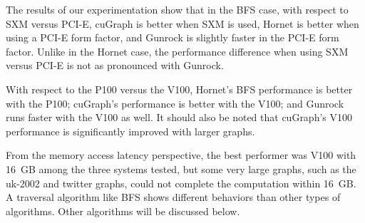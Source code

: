The results of our experimentation show that in the BFS case, with respect to SXM versus PCI-E, cuGraph is better when SXM is used, Hornet is better when using a PCI-E form factor, and Gunrock is slightly faster in the PCI-E form factor. Unlike in the Hornet case, the performance difference when using SXM versus PCI-E is not as pronounced with Gunrock.

With respect to the P100 versus the V100, Hornet's BFS performance is better with the P100; cuGraph's performance is better with the V100; and Gunrock runs faster with the V100 as well. It should also be noted that cuGraph's V100 performance is significantly improved with larger graphs.

From the memory access latency perspective, the best performer was V100 with 16~GB among the three systems tested, but some very large graphs, such as the uk-2002 and twitter graphs, could not complete the computation within 16~GB\@. A traversal algorithm like BFS shows different behaviors than other types of algorithms. Other algorithms will be discussed below.


